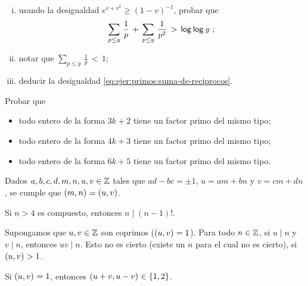 \begin{ejerPrimos}
\begin{enumerate}[(i)]
		\item\label{item:ejer:primos:suma-de-reciprocos:v}
			usando la desigualdad $e^{v+v^2}\geq (1-v)^{-1}$,
			probar que
			\begin{displaymath}
				\sum_{p\leq y}\,\frac 1{p}\,+\,
					\sum_{p\leq y}\,\frac 1{p^2}\,>\,
					\mathsf{log}_{}\,\mathsf{log}_{}\,y
				\text{ ;}
			\end{displaymath}
		\item\label{item:ejer:primos:suma-de-reciprocos:vi}
			notar que $\sum_{p\leq y}\,\frac 1{p}\,<\,1$;%
		\item\label{item:ejer:primos:suma-de-reciprocos:vii}
			deducir la desigualdad
			\eqref{eq:ejer:primos:suma-de-reciprocos}.
	\end{enumerate}
\end{ejerPrimos}

\begin{ejerPrimos}
	Probar que
	\begin{itemize}
		\item todo entero de la forma $3k+2$ tiene un factor primo
			del mismo tipo;
		\item todo entero de la forma $4k+3$ tiene un factor primo
			del mismo tipo;
		\item todo entero de la forma $6k+5$ tiene un factor primo
			del mismo tipo.
	\end{itemize}
\end{ejerPrimos}

\begin{ejerPrimos}
	Dados $a,b,c,d,m,n,u,v\in\mathbb{Z}$ tales que
	$ad-bc=\pm1$, $u=am+bn$ y $v=cm+dn$, se cumple que
	$\left({m,n}\right)_{}=\left({u,v}\right)_{}$.
\end{ejerPrimos}

\begin{ejerPrimos}
	Si $n>4$ es compuesto, entonces $n\mid (n-1)!$.
\end{ejerPrimos}

\begin{ejerPrimos}
	Supongamos que $u,v\in\mathbb{Z}$ son coprimos ($\left({u,v}\right)_{}=1$).
	Para todo $n\in\mathbb{Z}$, si $u\mid n$ y $v\mid n$, entonces
	$uv\mid n$. Esto no es cierto (existe un $n$ para el cual no es
	cierto), si $\left({u,v}\right)_{}>1$.
\end{ejerPrimos}

\begin{ejerPrimos}
	Si $\left({u,v}\right)_{}=1$, entonces $\left({u+v,u-v}\right)_{}\in\{1,2\}$.
\end{ejerPrimos}


